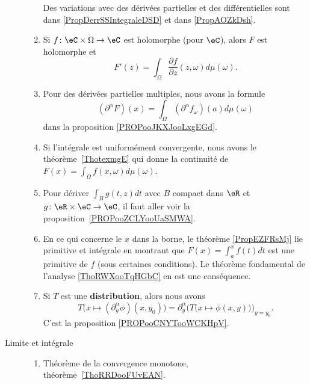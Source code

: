 \begin{description}
\begin{enumerate}
		            Des variations avec des dérivées partielles et des différentielles sont dans \ref{PropDerrSSIntegraleDSD} et dans \ref{PropAOZkDsh}.
		      \item
		            Si \( f\colon \eC\times \Omega\to \eC\) est holomorphe (pour \( \eC\)), alors \( F\) est holomorphe et
		            \begin{equation}
			            F'(z)=\int_{\Omega}\frac{ \partial f }{ \partial z }(z,\omega)d\mu(\omega).
		            \end{equation}
		      \item
		            Pour des dérivées partielles multiples, nous avons la formule
		            \begin{equation}
			            (\partial^{\alpha}F)(x)=\int_{\Omega}(\partial^{\alpha}f_{\omega})(a)d\mu(\omega)
		            \end{equation}
		            dans la proposition \ref{PROPooJKXJooLxgEGd}.
		      \item
		            Si l'intégrale est uniformément convergente, nous avons le théorème~\ref{ThotexmgE} qui donne la continuité de \( F(x)=\int_{\Omega}f(x,\omega)d\mu(\omega)\).
		      \item
		            Pour dériver \( \int_Bg(t,z)dt\) avec \( B\) compact dans \( \eR\) et \( g\colon \eR\times \eC\to \eC\), il faut aller voir la proposition~\ref{PROPooZCLYooUaSMWA}.
		      \item
		            En ce qui concerne le \( x\) dans la borne, le théorème \ref{PropEZFRsMj} lie primitive et intégrale en montrant que \( F(x)=\int_a^xf(t)dt\) est une primitive de \( f\) (sous certaines conditions). Le théorème fondamental de l'analyse \ref{ThoRWXooTqHGbC} en est une conséquence.
		      \item Si \( T\) est une \textbf{distribution}, alors nous avons
		            \begin{equation}
			            T\big( x\mapsto (\partial_y^{\alpha}\phi)(x,y_0) \big)=\partial_y^{\alpha}\Big( T\big( x\mapsto \phi(x,y) \big) \Big)_{y=y_0}.
		            \end{equation}
		            C'est la proposition \ref{PROPooCNYTooWCKHpV}.
	      \end{enumerate}
	\item[Limite et intégrale]
	      \begin{enumerate}
		      \item
		            Théorème de la convergence monotone, théorème~\ref{ThoRRDooFUvEAN}.
	      \end{enumerate}

\end{description}
